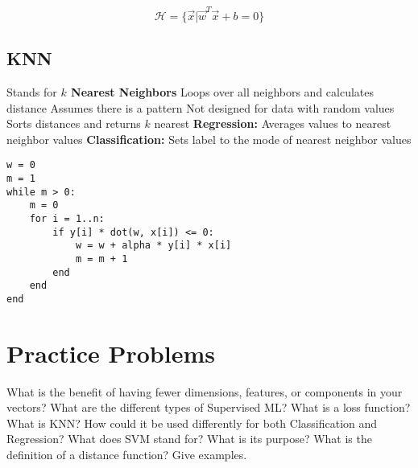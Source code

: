 \[
\mathcal{H} = \{\vec{x} | \vec{w}^T\vec{x} + b = 0\}
\]



\subsection{KNN\cite{guo2003knn}}
\begin{outline}
    \1 Stands for \textbf{$k$ Nearest Neighbors}
    \1 Loops over all neighbors and calculates distance
    \1 Assumes there is a pattern
    \1 Not designed for data with random values
    \1 Sorts distances and returns $k$ nearest
    \1 \textbf{Regression:} Averages values to nearest neighbor values
    \1 \textbf{Classification:} Sets label to the mode of nearest neighbor values
\end{outline}

\begin{verbatim}
w = 0
m = 1
while m > 0:
    m = 0
    for i = 1..n:
        if y[i] * dot(w, x[i]) <= 0:
            w = w + alpha * y[i] * x[i]
            m = m + 1
        end
    end
end
\end{verbatim}

\section{Practice Problems}

\begin{outline}[enumerate]
    \1 What is the benefit of having fewer dimensions, features, or components in your vectors?
    \1 What are the different types of Supervised ML?
    \1 What is a loss function?
    \1 What is KNN? How could it be used differently for both Classification and Regression?
    \1 What does SVM stand for? What is its purpose?
    \1 What is the definition of a distance function? Give examples.
\end{outline}


